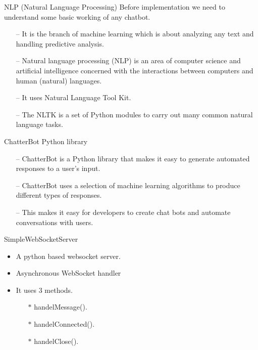 \documentclass{beamer}
\begin{document}
\begin{frame}{NLP (Natural Language Processing)}
Before implementation we need to understand some basic working of any chatbot.
\linebreak
\begin{itemize}
    \item[--] It is the branch of machine learning which is about analyzing any text and handling predictive analysis.
    \linebreak
    \item[--] Natural language processing (NLP) is an area of computer science and artificial intelligence concerned with the interactions between computers and human (natural) languages.
    \linebreak
    \item[--] It uses Natural Language Tool Kit.
    \linebreak
    \item[--] The NLTK is a set of Python modules to carry out many common natural language tasks.
\end{itemize}
    
\end{frame}
\begin{frame}{ChatterBot Python library}
   \begin{itemize}
    \item[--] ChatterBot is a Python library that makes it easy to generate automated responses to a user’s input.    
    \linebreak
    \item[--] ChatterBot uses a selection of machine learning algorithms to produce different types of responses. 
    \linebreak
    \item[--] This makes it easy for developers to create chat bots and automate conversations with users.
   \end{itemize}
\end{frame}

\begin{frame}{SimpleWebSocketServer}
 \begin{itemize}
     \item A python based websocket server.
     \linebreak
     \item Asynchronous WebSocket handler
     \linebreak
     \item It uses 3 methods.
     \linebreak
     \begin{itemize}
         \item[$\ast$] handelMessage().
         \linebreak
         \item[$\ast$] handelConnected().
         \linebreak
         \item[$\ast$] handelClose().
     \end{itemize}
 \end{itemize}
    
\end{frame}
\end{document}
